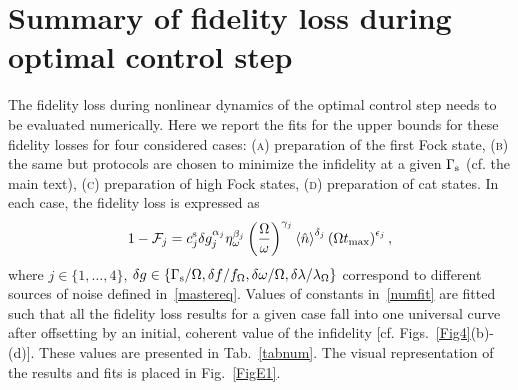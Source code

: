 \documentclass[reprint,prx,footinbib,floatfix,twocolumn,longbibliography,superscriptaddress]{revtex4-2}
\begin{document}
\section{Summary of fidelity loss during optimal control step}
\label{appE}
The fidelity loss during nonlinear dynamics of the optimal control step needs to be evaluated numerically. 
Here we report the fits for the upper bounds for these fidelity losses for four considered cases: (\textsc{a}) preparation of the first Fock state, (\textsc{b}) the same but protocols are chosen to minimize the infidelity at a given $\Gamma_{\text{s}}$ (cf. the main text), (\textsc{c}) preparation of high Fock states, (\textsc{d}) preparation of cat states.
In each case, the fidelity loss is expressed as
\begin{align}
    1-\mathcal{F}_j = c_j^{\text{s}} \delta g_j^{\alpha_j} \eta_{\omega}^{\beta_j} \left(\frac{\Omega}{\omega}\right)^{\gamma_j} \left<\hat{n}\right>^{\delta_j} \left( \Omega t_\text{max} \right)^{\epsilon_j},
    \label{numfit}
\end{align}
where $j \in \{1,\dots,4\}$, $\delta g \in \{ \Gamma_{\text{s}} / \Omega, \delta f/ f_\Omega, \delta \omega / \Omega, \delta \lambda /  \lambda_\Omega\}$ correspond to different sources of noise defined in~\eqref{mastereq}.
Values of constants in~\eqref{numfit} are fitted such that all the fidelity loss results for a given case fall into one universal curve after offsetting by an initial, coherent value of the infidelity [cf. Figs.~\ref{Fig4}(b)-(d)].
These values are presented in Tab.~\ref{tabnum}.
The visual representation of the results and fits is placed in Fig.~\ref{FigE1}.

\renewcommand{\theequation}{F\arabic{equation}}
\setcounter{equation}{0}
\end{document}
